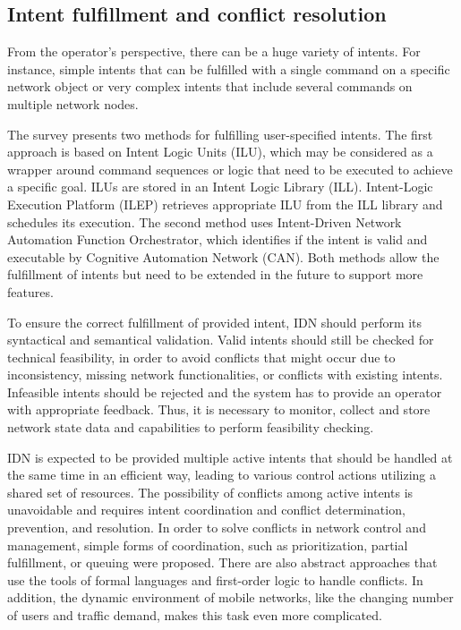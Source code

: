 \subsection{Intent fulfillment and conflict resolution}

From the operator’s perspective, there can be a huge variety of intents. For instance, simple intents that can be fulfilled with a single command on a specific network object or very complex intents that include several commands on multiple network nodes.

The survey \cite{Mwanje2021} presents two methods for fulfilling user-specified intents. The first approach is based on Intent Logic Units (ILU), which may be considered as a wrapper around command sequences or logic that need to be executed to achieve a specific goal. ILUs are stored in an Intent Logic Library (ILL). Intent-Logic Execution Platform (ILEP) retrieves appropriate ILU from the ILL library and schedules its execution. The second method uses Intent-Driven Network Automation Function Orchestrator, which identifies if the intent is valid and executable by Cognitive Automation Network (CAN). Both methods allow the fulfillment of intents but need to be extended in the future to support more features.

To ensure the correct fulfillment of provided intent, IDN should perform its syntactical and semantical validation. Valid intents should still be checked for technical feasibility, in order to avoid conflicts that might occur due to inconsistency, missing network functionalities, or conflicts with existing intents. Infeasible intents should be rejected and the system has to provide an operator with appropriate feedback. Thus, it is necessary to monitor, collect and store network state data and capabilities to perform feasibility checking.

IDN is expected to be provided multiple active intents that should be handled at the same time in an efficient way, leading to various control actions utilizing a shared set of resources. The possibility of conflicts among active intents is unavoidable and requires intent coordination and conflict determination, prevention, and resolution. In order to solve conflicts in network control and management, simple forms of coordination, such as prioritization, partial fulfillment, or queuing were proposed. There are also abstract approaches that use the tools of formal languages and first-order logic to handle conflicts. In addition, the dynamic environment of mobile networks, like the changing number of users and traffic demand, makes this task even more complicated.\cite{Mwanje2021}

